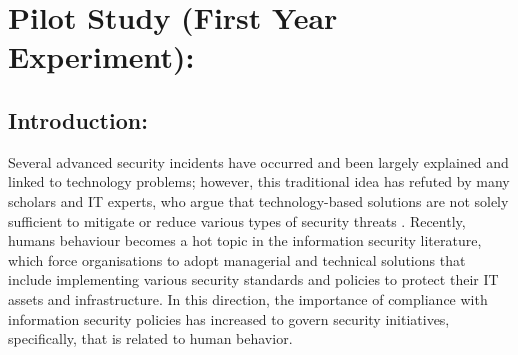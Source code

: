 
\section{Pilot Study (First Year Experiment):}
\subsection {Introduction:}
Several advanced security incidents have occurred and been largely explained and linked to technology problems; however, this traditional idea has refuted by many scholars and IT experts, who argue that technology-based solutions are not solely sufficient to mitigate or reduce various types of security threats  \cite{Kim2014,Ashenden2008,Safa2015}. Recently, humans behaviour becomes a hot topic in the information security literature, which force organisations to adopt managerial and technical solutions that include implementing various security standards and policies to protect their IT assets and infrastructure. In this direction, the importance of compliance with information security policies has increased to govern security initiatives, specifically, that is related to human behavior.\\

